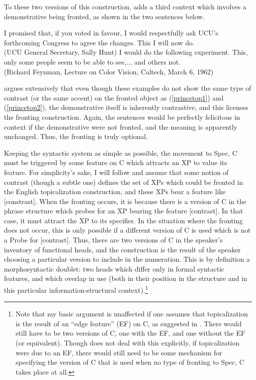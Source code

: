 To these two versions of this construction, \citet{caitldiss} adds a third context which involves a demonstrative being fronted, as shown in the two sentences below.


\begin{exe}
\ex \label{dem1} I promised that, if you voted in favour, I would respectfully ask UCU's forthcoming Congress to agree the changes.
This I will now do.\\
(UCU General Secretary, Sally Hunt)
\ex \label{dem2} I would do the following experiment.
This, only some people seem to be able to see,... and others not.\\
(Richard Feynman, Lecture on Color Vision, Caltech, March 6, 1962)
\end{exe}

\noindent \citet{caitldiss} argues extensively that even though these examples do not show the same type of contrast (or the same accent) on the fronted object as (\ref{princetop1}) and (\ref{princetop2}), the demonstrative itself is inherently contrastive, and this licenses the fronting construction.
Again, the sentences would be perfectly felicitous in context if the demonstrative were not fronted, and the meaning is apparently unchanged.
Thus, the fronting is truly optional.

Keeping the syntactic system as simple as possible, the movement to Spec, C must be triggered by some feature on C which attracts an XP to value its feature.
For simplicity's sake, I will follow \citet{caitldiss} and assume that some notion of contrast (though a subtle one) defines the set of XPs which could be fronted in the English topicalization construction, and these XPs bear a feature like [constrast].
When the fronting occurs, it is because there is a version of C in the phrase structure which probes for an XP bearing the feature [contrast].
In that case, it must attract the XP to its specifier.
In the situation where the fronting does not occur, this is only possible if a different version of C is used which is not a Probe for [contrast].
Thus, there are two versions of C in the speaker's inventory of functional heads, and the construction is the result of the speaker choosing a particular version to include in the numeration.
This is by definition a morphosyntactic doublet: two heads which differ only in formal syntactic features, and which overlap in use (both in their position in the structure and in this particular information-structural context).\footnote{Note that my basic argument is unaffected if one assumes that topicalization is the result of an ``edge feature'' (EF) on C, as suggested in \citet[][151]{chomsky2008}.
There would still have to be two versions of C, one with the EF, and one without the EF (or equivalent).
Though \citet{chomsky2008} does not deal with this explicitly, if topicalization were due to an EF, there would still need to be some mechanism for specifying the version of C that is used when no type of fronting to Spec, C takes place at all.} 

